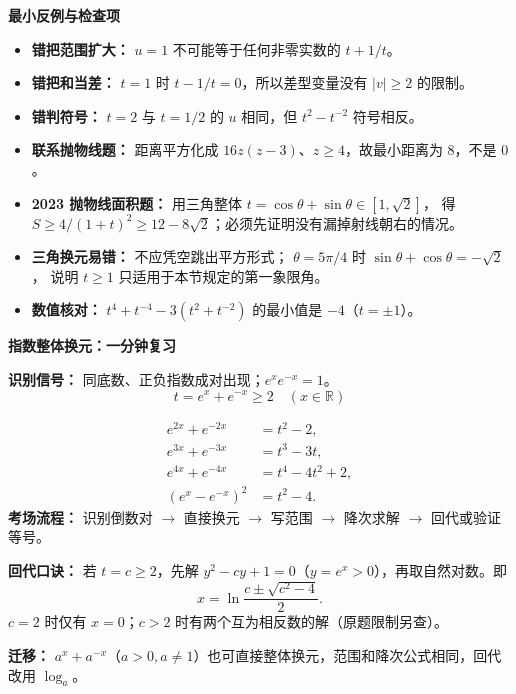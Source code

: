 \begin{summarybox}
    \medskip
    \textbf{\textcolor{CSummary}{最小反例与检查项}}
    \begin{itemize}[leftmargin=*, itemsep=0.43em, topsep=0.35em]
      \item \textbf{错把范围扩大：} $u=1$ 不可能等于任何非零实数的 $t+1/t$。
      \item \textbf{错把和当差：} $t=1$ 时 $t-1/t=0$，所以差型变量没有 $|v|\ge2$ 的限制。
      \item \textbf{错判符号：} $t=2$ 与 $t=1/2$ 的 $u$ 相同，但 $t^2-t^{-2}$ 符号相反。
      \item \textbf{联系抛物线题：} 距离平方化成 $16z(z-3)$、$z\ge4$，故最小距离为 $8$，不是 $0$。
      \item \textbf{2023 抛物线面积题：} 用三角整体
        $t=\cos\theta+\sin\theta\in[1,\sqrt2]$，
        得 $S\ge4/(1+t)^2\ge12-8\sqrt2$；必须先证明没有漏掉射线朝右的情况。
      \item \textbf{三角换元易错：} 不应凭空跳出平方形式；
        $\theta=5\pi/4$ 时 $\sin\theta+\cos\theta=-\sqrt2$，
        说明 $t\ge1$ 只适用于本节规定的第一象限角。
      \item \textbf{数值核对：} $t^4+t^{-4}-3(t^2+t^{-2})$ 的最小值是 $-4$（$t=\pm1$）。
    \end{itemize}
\end{summarybox}

\clearpage
\begin{summarybox}
\textbf{\textcolor{CSummary}{指数整体换元：一分钟复习}}

\textbf{识别信号：} 同底数、正负指数成对出现；$e^xe^{-x}=1$。
\[
\boxed{t=e^x+e^{-x}\ge2\quad(x\in\mathbb R)}
\]

\[
\begin{aligned}
e^{2x}+e^{-2x}&=t^2-2,\\
e^{3x}+e^{-3x}&=t^3-3t,\\
e^{4x}+e^{-4x}&=t^4-4t^2+2,\\
(e^x-e^{-x})^2&=t^2-4.
\end{aligned}
\]
\textbf{考场流程：} 识别倒数对 $\longrightarrow$ 直接换元 $\longrightarrow$ 写范围 $\longrightarrow$ 降次求解 $\longrightarrow$ 回代或验证等号。

\textbf{回代口诀：} 若 $t=c\ge2$，先解 $y^2-cy+1=0$（$y=e^x>0$），再取自然对数。即
\[
x=\ln\frac{c\pm\sqrt{c^2-4}}2.
\]
$c=2$ 时仅有 $x=0$；$c>2$ 时有两个互为相反数的解（原题限制另查）。

\textbf{迁移：} $a^x+a^{-x}$（$a>0,a\ne1$）也可直接整体换元，范围和降次公式相同，回代改用 $\log_a$。
\end{summarybox}
